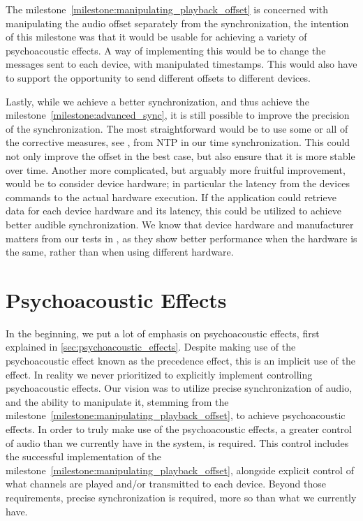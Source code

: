 \bigskip
The milestone~\ref{milestone:manipulating_playback_offset} is concerned with manipulating the audio offset separately from the synchronization, the intention of this milestone was that it would be usable for achieving a variety of psychoacoustic effects.
A way of implementing this would be to change the  messages sent to each device, with manipulated timestamps.
This would also have to support the opportunity to send different offsets to different devices.

\bigskip
Lastly, while we achieve a better synchronization, and thus achieve the milestone~\ref{milestone:advanced_sync}, it is still possible to improve the precision of the synchronization.
The most straightforward would be to use some or all of the corrective measures, see , from \ac{NTP} in our time synchronization.
This could not only improve the offset in the best case, but also ensure that it is more stable over time.
Another more complicated, but arguably more fruitful improvement, would be to consider device hardware; in particular the latency from the devices commands to the actual hardware execution.
If the application could retrieve data for each device hardware and its latency, this could be utilized to achieve better audible synchronization.
We know that device hardware and manufacturer matters from our tests in \cnameref{}, as they show better performance when the hardware is the same, rather than when using different hardware.

\section{Psychoacoustic Effects}
In the beginning, we put a lot of emphasis on psychoacoustic effects, first explained in \cref{sec:psychoacoustic_effects}.
Despite making use of the psychoacoustic effect known as the precedence effect, this is an implicit use of the effect.
In reality we never prioritized to explicitly implement controlling psychoacoustic effects.
Our vision was to utilize precise synchronization of audio, and the ability to manipulate it, stemming from the milestone~\ref{milestone:manipulating_playback_offset}, to achieve psychoacoustic effects.
In order to truly make use of the psychoacoustic effects, a greater control of audio than we currently have in the system, is required.
This control includes the successful implementation of the milestone~\ref{milestone:manipulating_playback_offset}, alongside explicit control of what channels are played and/or transmitted to each device.
Beyond those requirements, precise synchronization is required, more so than what we currently have.

